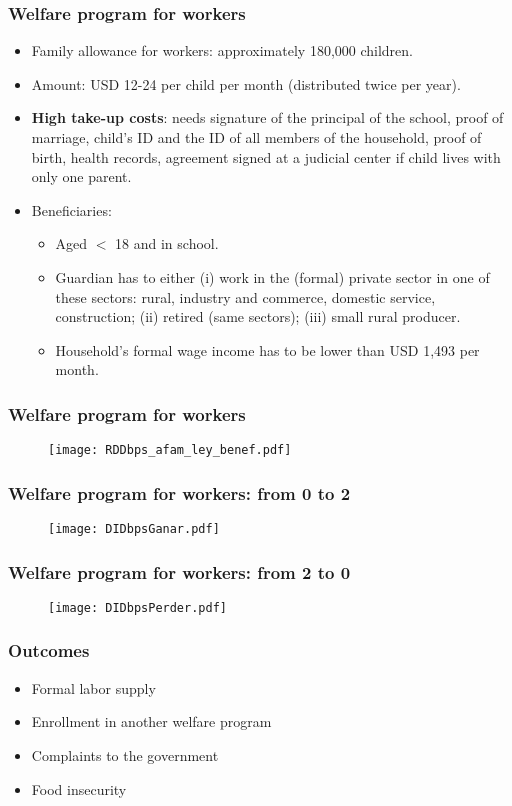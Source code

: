 \documentclass{beamer}
\begin{document}
\begin{frame}
\frametitle{Welfare program for workers}
\begin{itemize}
	\item Family allowance for workers: approximately 180,000 children.
	\item Amount: USD 12-24 per child per month (distributed twice per year).
	\item \textbf{High take-up costs}: needs signature of the principal of the school, proof of marriage, child's ID and the ID of all members of the household, proof of birth, health records, agreement signed at a judicial center if child lives with only one parent.
	\item Beneficiaries:
	\begin{itemize}
		\item Aged $<$ 18 and in school.
		\item Guardian has to either (i) work in the (formal) private sector in one of these sectors: rural, industry and commerce, domestic service, construction; (ii) retired (same sectors); (iii) small rural producer.
		\item Household's formal wage income has to be lower than USD 1,493 per month.
	\end{itemize}
\end{itemize}
\end{frame}

\begin{frame}
\frametitle{Welfare program for workers}
\begin{figure}
	\texttt{[image: RDDbps\_afam\_ley\_benef.pdf]}
\end{figure}
\end{frame}

\begin{frame}[label=welfare02]
\frametitle{Welfare program for workers: from 0 to 2}
\begin{figure}
	\texttt{[image: DIDbpsGanar.pdf]}
\end{figure}
\end{frame}

\begin{frame}[label=welfare20]
\frametitle{Welfare program for workers: from 2 to 0}
\begin{figure}
	\texttt{[image: DIDbpsPerder.pdf]}
\end{figure}
\end{frame}

\begin{frame}
\frametitle{Outcomes}
\begin{itemize}
	\item {\color{gray}Formal labor supply}
	\item {\color{gray}Enrollment in another welfare program}
	\item Complaints to the government
	\item {\color{gray}Food insecurity}
\end{itemize}
\end{frame}
\end{document}
